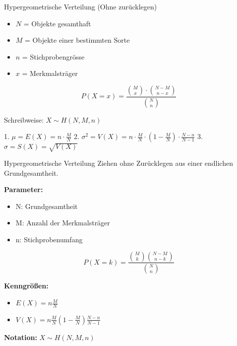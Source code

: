 \begin{definition}{Hypergeometrische Verteilung (Ohne zurücklegen)}
\begin{itemize}
  \item $N$ = Objekte gesamthaft
  \item $M$ = Objekte einer bestimmten Sorte
  \item $n$ = Stichprobengrösse
  \item $x$ = Merkmalsträger
\end{itemize}

$$P(X=x)=\frac{\binom{M}{x} \cdot \binom{N-M}{n-x}}{\binom{N}{n}}$$

Schreibweise: $X \sim H(N,M,n)$

1. $\mu = E(X) = n \cdot \frac{M}{N}$
2. $\sigma^2 = V(X) = n \cdot \frac{M}{N} \cdot (1-\frac{M}{N}) \cdot \frac{N-n}{N-1}$
3. $\sigma = S(X) = \sqrt{V(X)}$
\end{definition}

\begin{definition}{Hypergeometrische Verteilung}
Ziehen ohne Zurücklegen aus einer endlichen Grundgesamtheit.

\textbf{Parameter:}
\begin{itemize}
    \item N: Grundgesamtheit
    \item M: Anzahl der Merkmalsträger
    \item n: Stichprobenumfang
\end{itemize}

$$P(X=k) = \frac{\binom{M}{k}\binom{N-M}{n-k}}{\binom{N}{n}}$$

\textbf{Kenngrößen:}
\begin{itemize}
    \item $E(X) = n\frac{M}{N}$
    \item $V(X) = n\frac{M}{N}(1-\frac{M}{N})\frac{N-n}{N-1}$
\end{itemize}

\textbf{Notation:} $X \sim H(N,M,n)$
\end{definition}

